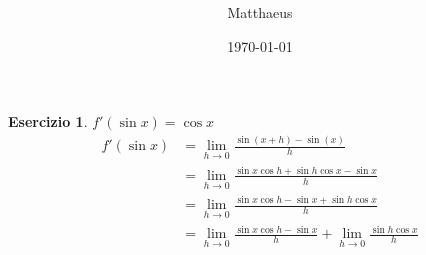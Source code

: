 \documentclass[italian]{article}
\theoremstyle{definition}
\newtheorem{ex}{Esercizio}
\begin{document}
\title{%
}
\author{Matthaeus}
\date{\today}
\maketitle
\begin{ex}
 $f'(\sin{x}) = \cos{x}$
    \begin{align*}
       f'(\sin{x}) & = \lim_{h \rightarrow 0} \frac{\sin(x+h) -
       \sin(x)}{h}\\
            &= \lim_{h \rightarrow 0} \frac{\sin{x}\cos{h}+\sin{h}\cos{x} -
       \sin{x}}{h}\\
            &= \lim_{h \rightarrow 0} \frac{\sin{x}\cos{h} - \sin{x} +\sin{h}\cos{x}}{h}\\
            &= \lim_{h \rightarrow 0} \frac{\sin{x}\cos{h} - \sin{x}}{h} +  \lim_{h \rightarrow 0} \frac{\sin{h}\cos{x}}{h}\\
    \end{align*}
    \end{ex}
\end{document}
